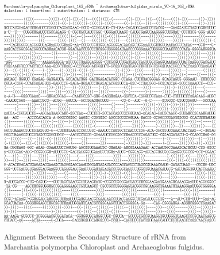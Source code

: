 \begin{figure}
		\centering
		\includegraphics[width=17cm,clip]{Figures/AlignmentResult2}
		\label{Alignment Between Two RNAs.} 
		\caption{Alignment Between the Secondary Structure of rRNA from Marchantia polymorpha Chloroplast and Archaeoglobus fulgidus.}
\end{figure}



